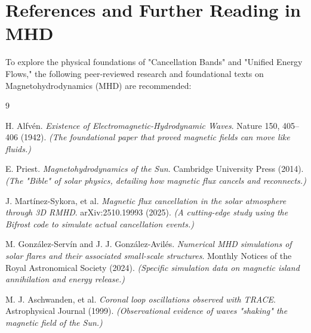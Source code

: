 \documentclass[11pt]{article}
\begin{document}
\section*{References and Further Reading in MHD}

To explore the physical foundations of "Cancellation Bands" and "Unified Energy Flows," the following peer-reviewed research and foundational texts on Magnetohydrodynamics (MHD) are recommended:

\begin{thebibliography}{9}

H. Alfvén. 
\textit{Existence of Electromagnetic-Hydrodynamic Waves}. 
Nature 150, 405–406 (1942). 
\textit{(The foundational paper that proved magnetic fields can move like fluids.)}

E. Priest. 
\textit{Magnetohydrodynamics of the Sun}. 
Cambridge University Press (2014). 
\textit{(The "Bible" of solar physics, detailing how magnetic flux cancels and reconnects.)}

J. Martínez-Sykora, et al. 
\textit{Magnetic flux cancellation in the solar atmosphere through 3D RMHD}. 
arXiv:2510.19993 (2025). 
\textit{(A cutting-edge study using the Bifrost code to simulate actual cancellation events.)}

M. González-Servín and J. J. González-Avilés. 
\textit{Numerical MHD simulations of solar flares and their associated small-scale structures}. 
Monthly Notices of the Royal Astronomical Society (2024). 
\textit{(Specific simulation data on magnetic island annihilation and energy release.)}

M. J. Aschwanden, et al. 
\textit{Coronal loop oscillations observed with TRACE}. 
Astrophysical Journal (1999). 
\textit{(Observational evidence of waves "shaking" the magnetic field of the Sun.)}

\end{thebibliography}
\end{document}
